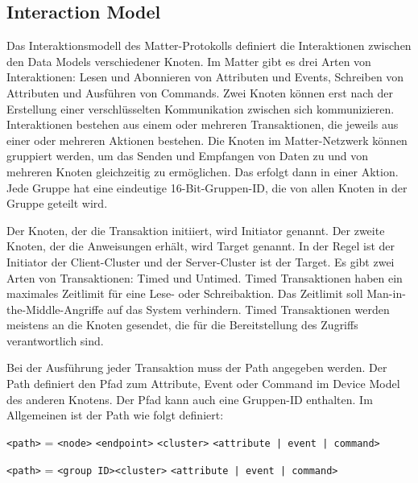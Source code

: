 \documentclass[12pt, a4paper]{article}
\begin{document}
\subsection{Interaction  Model}
\par Das Interaktionsmodell des Matter-Protokolls definiert die Interaktionen zwischen den Data Models verschiedener Knoten. Im Matter gibt es drei Arten von Interaktionen: Lesen und Abonnieren von Attributen und Events, Schreiben von Attributen und Ausführen von Commands. Zwei Knoten können erst nach der Erstellung einer verschlüsselten Kommunikation zwischen sich kommunizieren. Interaktionen bestehen aus einem oder mehreren Transaktionen, die jeweils aus einer oder mehreren Aktionen bestehen. Die Knoten im Matter-Netzwerk können gruppiert werden, um das Senden und Empfangen von Daten zu und von mehreren Knoten gleichzeitig zu ermöglichen. Das erfolgt dann in einer Aktion. Jede Gruppe hat eine eindeutige 16-Bit-Gruppen-ID, die von allen Knoten in der Gruppe geteilt wird.
\par Der Knoten, der die Transaktion initiiert, wird Initiator genannt. Der zweite Knoten, der die Anweisungen erhält, wird Target genannt. In der Regel ist der Initiator der Client-Cluster und der Server-Cluster ist der Target. Es gibt zwei Arten von Transaktionen: Timed und Untimed. Timed Transaktionen haben ein maximales Zeitlimit für eine Lese- oder Schreibaktion. Das Zeitlimit soll Man-in-the-Middle-Angriffe auf das System verhindern. Timed Transaktionen werden meistens an die Knoten gesendet, die für die Bereitstellung des Zugriffs verantwortlich sind.
\par Bei der Ausführung jeder Transaktion muss der Path angegeben werden. Der Path definiert den Pfad zum Attribute, Event oder Command im Device Model des anderen Knotens. Der Pfad kann auch eine Gruppen-ID enthalten. Im Allgemeinen ist der Path wie folgt definiert:
\par \texttt{<path>} = \texttt{<node>} \texttt{<endpoint>} \texttt{<cluster>} \texttt{<attribute | event | command>}
\par \texttt{<path>} = \quad\quad\texttt{<group ID>}\quad\quad \texttt{<cluster>} \texttt{<attribute | event | command>}
\end{document}
